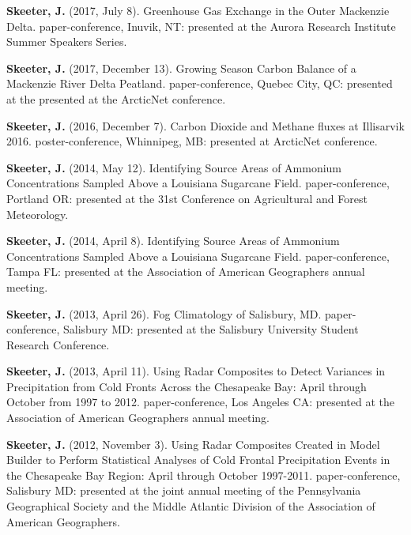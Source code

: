 \documentclass[
]{article}
\newlength{\cslhangindent}
\newlength{\cslentryspacingunit} %
\newenvironment{CSLReferences}[2] %
 {%
  \setlength{\parindent}{0pt}
  \ifodd #1
  \let\oldpar\par
  \def\par{\hangindent=\cslhangindent\oldpar}
  \fi
  \setlength{\parskip}{#2\cslentryspacingunit}
 }%
 {}
\begin{document}
\begin{CSLReferences}{1}{0}
\leavevmode{}%
\textbf{Skeeter, J.} (2017, July 8). Greenhouse Gas Exchange in the
Outer Mackenzie Delta. paper-conference, Inuvik, NT: presented at the
Aurora Research Institute Summer Speakers Series.

\leavevmode{}%
\textbf{Skeeter, J.} (2017, December 13). Growing Season Carbon Balance
of a Mackenzie River Delta Peatland. paper-conference, Quebec City, QC:
presented at the presented at the ArcticNet conference.

\leavevmode{}%
\textbf{Skeeter, J.} (2016, December 7). Carbon Dioxide and Methane
fluxes at Illisarvik 2016. poster-conference, Whinnipeg, MB: presented
at ArcticNet conference.

\leavevmode{}%
\textbf{Skeeter, J.} (2014, May 12). Identifying Source Areas of
Ammonium Concentrations Sampled Above a Louisiana Sugarcane Field.
paper-conference, Portland OR: presented at the 31st Conference on
Agricultural and Forest Meteorology.

\leavevmode{}%
\textbf{Skeeter, J.} (2014, April 8). Identifying Source Areas of
Ammonium Concentrations Sampled Above a Louisiana Sugarcane Field.
paper-conference, Tampa FL: presented at the Association of American
Geographers annual meeting.

\leavevmode{}%
\textbf{Skeeter, J.} (2013, April 26). Fog Climatology of Salisbury, MD.
paper-conference, Salisbury MD: presented at the Salisbury University
Student Research Conference.

\leavevmode{}%
\textbf{Skeeter, J.} (2013, April 11). Using Radar Composites to Detect
Variances in Precipitation from Cold Fronts Across the Chesapeake Bay:
April through October from 1997 to 2012. paper-conference, Los Angeles
CA: presented at the Association of American Geographers annual meeting.

\leavevmode{}%
\textbf{Skeeter, J.} (2012, November 3). Using Radar Composites Created
in Model Builder to Perform Statistical Analyses of Cold Frontal
Precipitation Events in the Chesapeake Bay Region: April through October
1997-2011. paper-conference, Salisbury MD: presented at the joint annual
meeting of the Pennsylvania Geographical Society and the Middle Atlantic
Division of the Association of American Geographers.

\end{CSLReferences}
\end{document}
